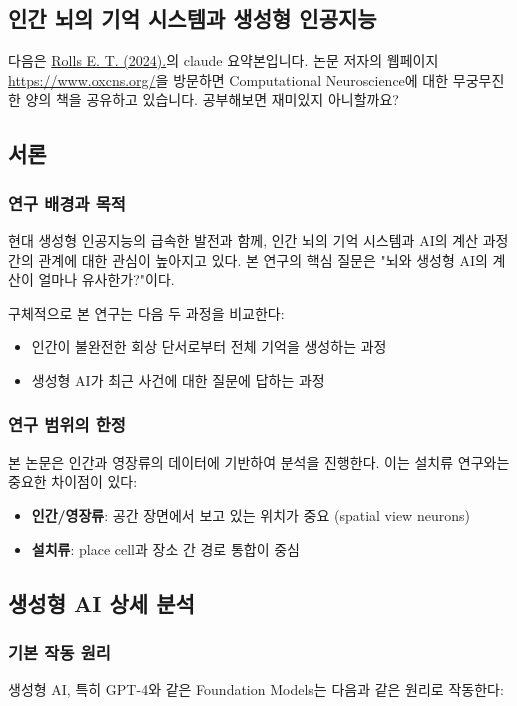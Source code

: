 \documentclass[openany]{book}
\begin{document}
\begin{appendices}
\chapter{인간 뇌의 기억 시스템과 생성형 인공지능}

다음은 \href{https://pmc.ncbi.nlm.nih.gov/articles/PMC11152951/}{Rolls E. T. (2024).}의 claude 요약본입니다.
논문 저자의 웹페이지 \url{https://www.oxcns.org/}을 방문하면 Computational Neuroscience에 대한 무궁무진한 양의 책을 공유하고 있습니다.
공부해보면 재미있지 아니할까요?

\section{서론}

\subsection{연구 배경과 목적}
현대 생성형 인공지능의 급속한 발전과 함께, 인간 뇌의 기억 시스템과 AI의 계산 과정 간의 관계에 대한 관심이 높아지고 있다. 본 연구의 핵심 질문은 "뇌와 생성형 AI의 계산이 얼마나 유사한가?"이다. 

구체적으로 본 연구는 다음 두 과정을 비교한다:
\begin{itemize}
\item 인간이 불완전한 회상 단서로부터 전체 기억을 생성하는 과정
\item 생성형 AI가 최근 사건에 대한 질문에 답하는 과정
\end{itemize}

\subsection{연구 범위의 한정}
본 논문은 인간과 영장류의 데이터에 기반하여 분석을 진행한다. 이는 설치류 연구와는 중요한 차이점이 있다:

\begin{itemize}
\item \textbf{인간/영장류}: 공간 장면에서 보고 있는 위치가 중요 (spatial view neurons)
\item \textbf{설치류}: place cell과 장소 간 경로 통합이 중심
\end{itemize}

\section{생성형 AI 상세 분석}

\subsection{기본 작동 원리}
생성형 AI, 특히 GPT-4와 같은 Foundation Models는 다음과 같은 원리로 작동한다:


\end{appendices}
\end{document}
